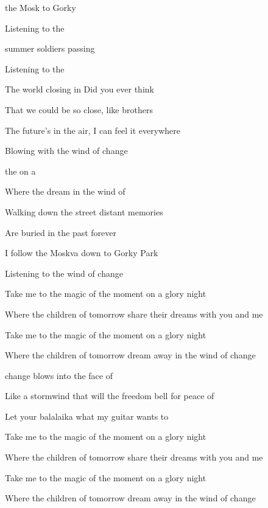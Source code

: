 

\zs
{} the Mosk to Gorky 

Listening to the  

 summer  soldiers passing 

Listening to the  
\ks

\zs
The world closing in Did you ever think

That we could be so close, like brothers

The future's in the air, I can feel it everywhere

Blowing with the wind of change
\ks

\zr
{}  the   on a  

Where the  dream  in the wind of 
\kr

\zs
Walking down the street distant memories

Are buried in the past forever

I follow the Moskva down to Gorky Park

Listening to the wind of change
\ks

\zr
Take me to the magic of the moment on a glory night

Where the children of tomorrow share their dreams with you and me

Take me to the magic of the moment on a glory night

Where the children of tomorrow dream away in the wind of change
\kr

\zs
{} change blows  into the face of 

Like a stormwind that will  the freedom bell for peace of 

Let your balalaika  what my guitar wants to 
\ks

\zr
Take me to the magic of the moment on a glory night

Where the children of tomorrow share their dreams with you and me

Take me to the magic of the moment on a glory night

Where the children of tomorrow dream away in the wind of change
\kr

\kp
